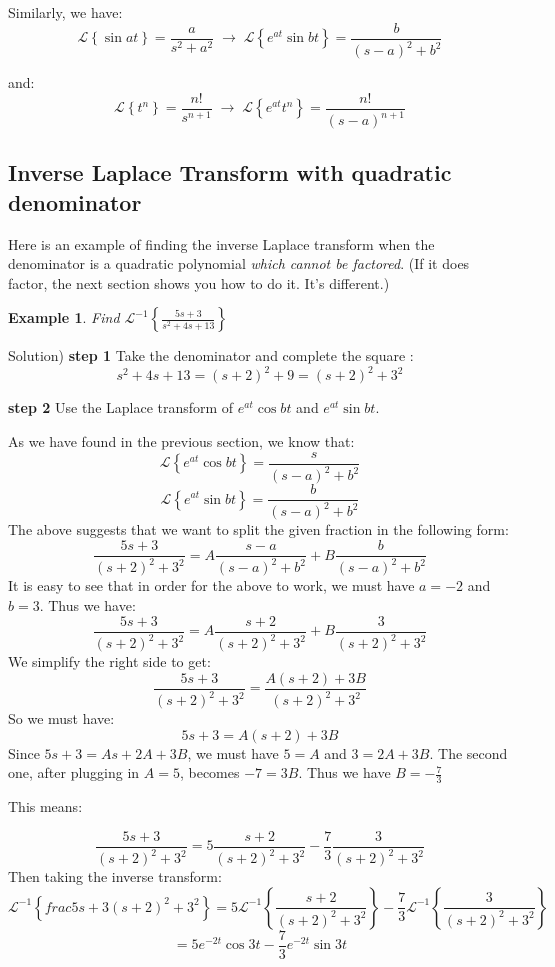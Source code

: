 \documentclass[12pt]{report}
\newtheorem{ex}{Example}[section]
\begin{document}
Similarly, we have:
$$ \mathscr{L} \left\{ \sin at \right\} = \frac{a}{s^2 + a^2}  \; \rightarrow \;\mathscr{L} \left\{ e^{at} \sin bt \right\} = \frac{b}{(s-a)^2 + b^2} $$

and:
$$ \mathscr{L} \left\{t^n\right\}= \frac{n!}{s^{n+1}}  \; \rightarrow \; \mathscr{L} \left\{e^{at} t^n\right\}= \frac{n!}{(s-a)^{n+1}} $$

\subsection*{Inverse Laplace Transform with quadratic denominator}

Here is an example of finding the inverse Laplace transform when the denominator is a quadratic polynomial \textit{which cannot be factored}. (If it does factor, the next section shows you how to do it. It's different.)

\begin{ex} Find $ \mathscr{L}^{-1} \left\{ \frac{5s+3}{s^2+4s+13} \right\} $
\end{ex}

Solution)
\textbf{step 1} Take the denominator and complete the square :
$$ s^2+4s+13 = (s+2)^2 + 9 = (s+2)^2 +3^2 $$

\textbf{step 2} Use the Laplace transform of $e^{at} \cos bt $ and $e^{at} \sin bt $.

As we have found in the previous section, we know that:
$$ \mathscr{L} \left\{ e^{at} \cos bt \right\} = \frac{s}{(s-a)^2 + b^2} $$
$$ \mathscr{L} \left\{ e^{at} \sin bt \right\} = \frac{b}{(s-a)^2 + b^2} $$
The above suggests that we want to split the given fraction in the following form:
$$\frac{5s+3}{(s+2)^2 +3^2} = A \frac{s-a}{ (s-a)^2 + b^2} + B \frac{b}{ (s-a)^2 + b^2} $$
It is easy to see that in order for the above to work, we must have $a=-2$ and $b=3$. Thus we have:
$$\frac{5s+3}{(s+2)^2 +3^2} = A \frac{s+2}{ (s+2)^2 + 3^2} + B \frac{3}{ (s+2)^2 + 3^2} $$
We simplify the right side to get:
$$\frac{5s+3}{(s+2)^2 +3^2} =  \frac{A(s+2)+3B}{ (s+2)^2 + 3^2} $$
So we must have:
$$5s+3 = A(s+2)+3B$$
Since $5s+3 = As+2A+3B$, we must have $5=A$ and $3=2A+3B$. The second one, after plugging in $A=5$, becomes $ -7 = 3B$. Thus we have $B= -\frac{7}{3}$

This means:

$$\frac{5s+3}{(s+2)^2 +3^2} = 5 \frac{s+2}{ (s+2)^2 + 3^2}  -\frac{7}{3} \frac{3}{ (s+2)^2 + 3^2} $$
Then taking the inverse transform:
$$\mathscr{L}^{-1} \left\{frac{5s+3}{(s+2)^2 +3^2} \right\} = 5 \mathscr{L}^{-1} \left\{\frac{s+2}{ (s+2)^2 + 3^2} \right\} -\frac{7}{3} \mathscr{L}^{-1} \left\{\frac{3}{ (s+2)^2 + 3^2} \right\}$$
$$ = 5 e^{-2t} \cos 3t - \frac{7}{3} e^{-2t} \sin 3t$$
\end{document}
